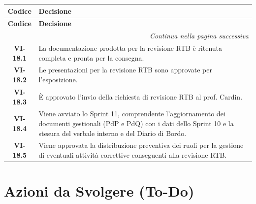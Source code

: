 \renewcommand{\arraystretch}{1.3}
\vspace{-0.3cm}
\noindent
\begin{longtable}{c p{12cm}}
    \toprule
    \textbf{Codice} & \textbf{Decisione} \\
    \midrule
    \endfirsthead

    \toprule
    \textbf{Codice} & \textbf{Decisione} \\
    \midrule
    \endhead

    \midrule
    \multicolumn{2}{r}{\textit{Continua nella pagina successiva}} \\
    \midrule
    \endfoot

    \bottomrule
    \endlastfoot

    \textbf{VI-18.1} & La documentazione prodotta per la revisione RTB è ritenuta completa e pronta per la consegna. \\[4pt] 
    \textbf{VI-18.2} & Le presentazioni per la revisione RTB sono approvate per l'esposizione. \\[4pt] 
    \textbf{VI-18.3} & È approvato l'invio della richiesta di revisione RTB al prof. Cardin. \\[4pt] 
    \textbf{VI-18.4} & Viene avviato lo Sprint 11, comprendente l'aggiornamento dei documenti gestionali (PdP e PdQ) con i dati dello Sprint 10 e la stesura del verbale interno e del Diario di Bordo.\\[4pt]
    \textbf{VI-18.5} & Viene approvata la distribuzione preventiva dei ruoli per la gestione di eventuali attività correttive conseguenti alla revisione RTB. \\
\end{longtable}

\section{Azioni da Svolgere (To-Do)}

